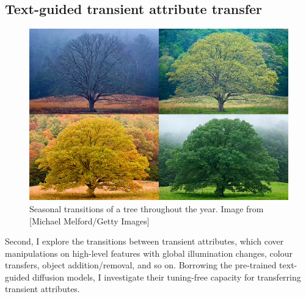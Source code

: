 
\subsection{Text-guided transient attribute transfer} 

\begin{figure}[ht]
  \centering

    \includegraphics[width=\linewidth]{Images/seasonchanges.png}

   \caption{Seasonal transitions of a tree throughout the year. Image from [Michael Melford/Getty Images]}
   \label{fig:colour-approximate}
\end{figure}

Second, I explore the transitions between transient attributes, which cover manipulations on high-level features with global illumination changes, colour transfers, object addition/removal, and so on. Borrowing the pre-trained text-guided diffusion models, I investigate their tuning-free capacity for transferring transient attributes.
